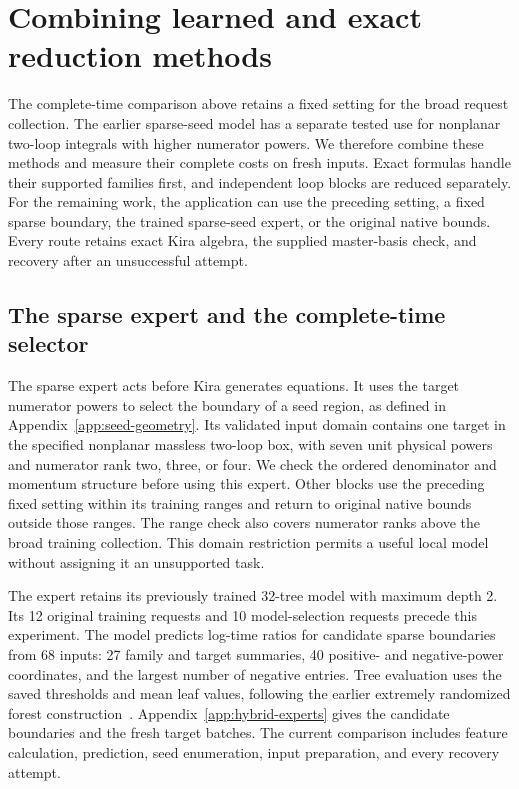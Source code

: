 \section{Combining learned and exact reduction methods}
\label{sec:hybrid-experts}
The complete-time comparison above retains a fixed setting for the broad request collection. The earlier sparse-seed model has a separate tested use for nonplanar two-loop integrals with higher numerator powers. We therefore combine these methods and measure their complete costs on fresh inputs. Exact formulas handle their supported families first, and independent loop blocks are reduced separately. For the remaining work, the application can use the preceding setting, a fixed sparse boundary, the trained sparse-seed expert, or the original native bounds. Every route retains exact Kira algebra, the supplied master-basis check, and recovery after an unsuccessful attempt.

\subsection{The sparse expert and the complete-time selector}
The sparse expert acts before Kira generates equations. It uses the target numerator powers to select the boundary of a seed region, as defined in Appendix~\ref{app:seed-geometry}. Its validated input domain contains one target in the specified nonplanar massless two-loop box, with seven unit physical powers and numerator rank two, three, or four. We check the ordered denominator and momentum structure before using this expert. Other blocks use the preceding fixed setting within its training ranges and return to original native bounds outside those ranges. The range check also covers numerator ranks above the broad training collection. This domain restriction permits a useful local model without assigning it an unsupported task.

The expert retains its previously trained 32-tree model with maximum depth 2. Its 12 original training requests and 10 model-selection requests precede this experiment. The model predicts log-time ratios for candidate sparse boundaries from 68 inputs: 27 family and target summaries, 40 positive- and negative-power coordinates, and the largest number of negative entries. Tree evaluation uses the saved thresholds and mean leaf values, following the earlier extremely randomized forest construction~\cite{Geurts2006ExtraTrees}. Appendix~\ref{app:hybrid-experts} gives the candidate boundaries and the fresh target batches. The current comparison includes feature calculation, prediction, seed enumeration, input preparation, and every recovery attempt.

